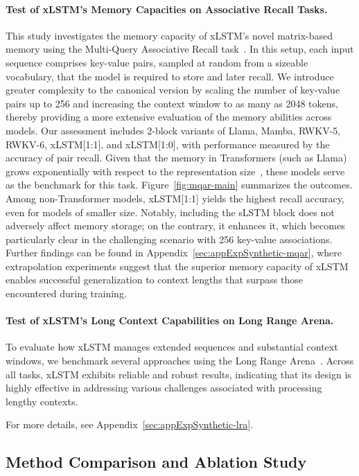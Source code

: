 \paragraph{Test of xLSTM's Memory Capacities on Associative Recall Tasks.} This study investigates the memory capacity of xLSTM’s novel matrix-based memory using the Multi-Query Associative Recall task~\citep{Arora:23arxiv}. In this setup, each input sequence comprises key-value pairs, sampled at random from a sizeable vocabulary, that the model is required to store and later recall. We introduce greater complexity to the canonical version by scaling the number of key-value pairs up to 256 and increasing the context window to as many as 2048 tokens, thereby providing a more extensive evaluation of the memory abilities across models. Our assessment includes 2-block variants of Llama, Mamba, RWKV-5, RWKV-6, xLSTM[1:1], and xLSTM[1:0], with performance measured by the accuracy of pair recall. Given that the memory in Transformers (such as Llama) grows exponentially with respect to the representation size~\citep{Ramsauer:21}, these models serve as the benchmark for this task. Figure~\ref{fig:mqar-main} summarizes the outcomes. 
Among non-Transformer models, xLSTM[1:1] yields the highest recall accuracy, even for models of smaller size. Notably, including the sLSTM block does not adversely affect memory storage; on the contrary, it enhances it, which becomes particularly clear in the challenging scenario with 256 key-value associations. Further findings can be found in Appendix~\ref{sec:appExpSynthetic-mqar}, where extrapolation experiments suggest that the superior memory capacity of xLSTM enables successful generalization to context lengths that surpass those encountered during training.

\paragraph{Test of xLSTM's Long Context Capabilities on Long Range Arena.} To evaluate how xLSTM manages extended sequences and substantial context windows, we benchmark several approaches using the Long Range Arena~\citep{Tay:21}. Across all tasks, xLSTM exhibits reliable and robust results, indicating that its design is highly effective in addressing various challenges associated with processing lengthy contexts.

For more details, see Appendix~\ref{sec:appExpSynthetic-lra}.

\subsection{Method Comparison and Ablation Study}
\label{sec:ExpComparison}

